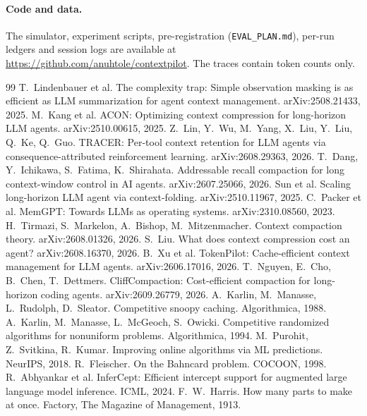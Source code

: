 \documentclass[11pt]{article}
\newif\ifanon \anonfalse
\begin{document}
\paragraph{Code and data.} The simulator, experiment scripts, pre-registration (\texttt{EVAL\_PLAN.md}), per-run ledgers and session logs are available at \ifanon an anonymized repository (link withheld for review)\else\url{https://github.com/anuhtole/contextpilot}\fi. The traces contain token counts only.

\begin{thebibliography}{99}
 T.~Lindenbauer et al. The complexity trap: Simple observation masking is as efficient as LLM summarization for agent context management. arXiv:2508.21433, 2025.
 M.~Kang et al. ACON: Optimizing context compression for long-horizon LLM agents. arXiv:2510.00615, 2025.
 Z.~Lin, Y.~Wu, M.~Yang, X.~Liu, Y.~Liu, Q.~Ke, Q.~Guo. TRACER: Per-tool context retention for LLM agents via consequence-attributed reinforcement learning. arXiv:2608.29363, 2026.
 T.~Dang, Y.~Ichikawa, S.~Fatima, K.~Shirahata. Addressable recall compaction for long context-window control in AI agents. arXiv:2607.25066, 2026.
 Sun et al. Scaling long-horizon LLM agent via context-folding. arXiv:2510.11967, 2025.
 C.~Packer et al. MemGPT: Towards LLMs as operating systems. arXiv:2310.08560, 2023.
 H.~Tirmazi, S.~Markelon, A.~Bishop, M.~Mitzenmacher. Context compaction theory. arXiv:2608.01326, 2026.
 S.~Liu. What does context compression cost an agent? arXiv:2608.16370, 2026.
 B.~Xu et al. TokenPilot: Cache-efficient context management for LLM agents. arXiv:2606.17016, 2026.
 T.~Nguyen, E.~Cho, B.~Chen, T.~Dettmers. CliffCompaction: Cost-efficient compaction for long-horizon coding agents. arXiv:2609.26779, 2026.
 A.~Karlin, M.~Manasse, L.~Rudolph, D.~Sleator. Competitive snoopy caching. Algorithmica, 1988.
 A.~Karlin, M.~Manasse, L.~McGeoch, S.~Owicki. Competitive randomized algorithms for nonuniform problems. Algorithmica, 1994.
 M.~Purohit, Z.~Svitkina, R.~Kumar. Improving online algorithms via ML predictions. NeurIPS, 2018.
 R.~Fleischer. On the Bahncard problem. COCOON, 1998.
 R.~Abhyankar et al. InferCept: Efficient intercept support for augmented large language model inference. ICML, 2024.
 F.~W.~Harris. How many parts to make at once. Factory, The Magazine of Management, 1913.

\end{thebibliography}
\end{document}
